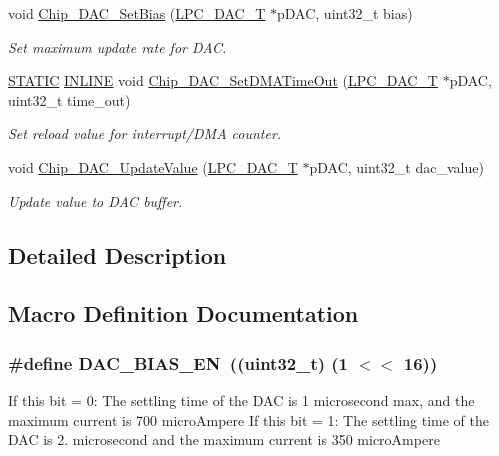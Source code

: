 \begin{DoxyCompactItemize}
void \hyperlink{group__DAC__17XX__40XX_ga01352564a69b1286d45a65cf06a246f2}{Chip\+\_\+\+D\+A\+C\+\_\+\+Set\+Bias} (\hyperlink{structLPC__DAC__T}{L\+P\+C\+\_\+\+D\+A\+C\+\_\+T} $\ast$p\+D\+AC, uint32\+\_\+t bias)
\begin{DoxyCompactList}\small\item\em Set maximum update rate for D\+AC. \end{DoxyCompactList}\item 
\hyperlink{group__LPC__Types__Public__Macros_ga10b2d890d871e1489bb02b7e70d9bdfb}{S\+T\+A\+T\+IC} \hyperlink{group__LPC__Types__Public__Types_ga2eb6f9e0395b47b8d5e3eeae4fe0c116}{I\+N\+L\+I\+NE} void \hyperlink{group__DAC__17XX__40XX_ga25d6e27e6b906dc2062257175697b438}{Chip\+\_\+\+D\+A\+C\+\_\+\+Set\+D\+M\+A\+Time\+Out} (\hyperlink{structLPC__DAC__T}{L\+P\+C\+\_\+\+D\+A\+C\+\_\+T} $\ast$p\+D\+AC, uint32\+\_\+t time\+\_\+out)
\begin{DoxyCompactList}\small\item\em Set reload value for interrupt/\+D\+MA counter. \end{DoxyCompactList}\item 
void \hyperlink{group__DAC__17XX__40XX_ga8fa415039ac2f63388ff12cf43cc45bf}{Chip\+\_\+\+D\+A\+C\+\_\+\+Update\+Value} (\hyperlink{structLPC__DAC__T}{L\+P\+C\+\_\+\+D\+A\+C\+\_\+T} $\ast$p\+D\+AC, uint32\+\_\+t dac\+\_\+value)
\begin{DoxyCompactList}\small\item\em Update value to D\+AC buffer. \end{DoxyCompactList}\end{DoxyCompactItemize}


\subsection{Detailed Description}


\subsection{Macro Definition Documentation}
\subsubsection[{\texorpdfstring{D\+A\+C\+\_\+\+B\+I\+A\+S\+\_\+\+EN}{DAC_BIAS_EN}}]{\setlength{\rightskip}{0pt plus 5cm}\#define D\+A\+C\+\_\+\+B\+I\+A\+S\+\_\+\+EN~((uint32\+\_\+t) (1 $<$$<$ 16))}\hypertarget{group__DAC__17XX__40XX_gabdfe0f0d61a206418a2ffdba26653873}{}\label{group__DAC__17XX__40XX_gabdfe0f0d61a206418a2ffdba26653873}
If this bit = 0\+: The settling time of the D\+AC is 1 microsecond max, and the maximum current is 700 micro\+Ampere If this bit = 1\+: The settling time of the D\+AC is 2. microsecond and the maximum current is 350 micro\+Ampere 

